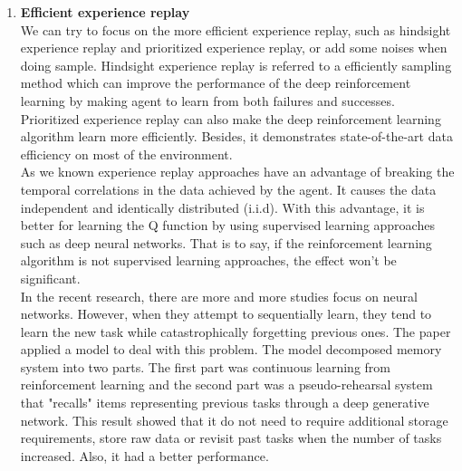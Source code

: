 \begin{enumerate}
    \item \textbf{Efficient experience replay}\\
    We can try to focus on the more efficient experience replay, such as hindsight experience replay and prioritized experience replay, or add some noises when doing sample.
    Hindsight experience replay \cite{lee2021deep} is referred to a efficiently sampling method which can improve the performance of the deep reinforcement learning by making agent to learn from both failures and successes.
    Prioritized experience replay \cite{schaul2015prioritized} can also make the deep reinforcement learning algorithm learn more efficiently. Besides, it demonstrates state-of-the-art data efficiency on most of the environment.
    \\  
    As we known experience replay approaches have an advantage of breaking the temporal correlations in the data achieved by the agent. 
    It causes the data independent and identically distributed (i.i.d). With this advantage, it is better for learning the Q function by using supervised learning approaches such as deep neural networks. That is to say, if the reinforcement learning algorithm is not supervised learning approaches, the effect won’t be significant. 
    \\
    In the recent research, there are more and more studies focus on neural networks. However, when they attempt to sequentially learn, they tend to learn the new task while catastrophically forgetting previous ones. 
    The paper \cite{atkinson2021pseudo} applied a model to deal with this problem. The model decomposed memory system into two parts. 
    The first part was continuous learning from reinforcement learning and the second part was a pseudo-rehearsal system that "recalls" items representing previous tasks through a deep generative network. 
    This result showed that it do not need to require additional storage requirements, store raw data or revisit past tasks when the number of tasks increased. Also, it had a better performance. 
\end{enumerate}


